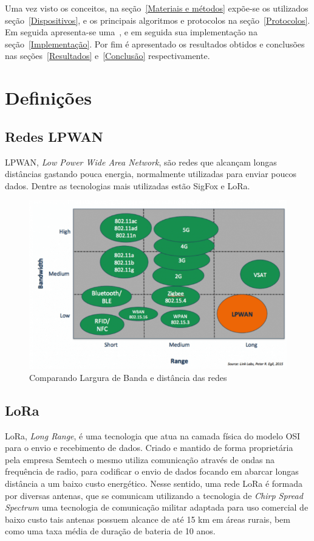 \documentclass[
article,			%
12pt,				%
oneside,			%
a4paper,			%
english,			%
brazil,				%
sumario=tradicional
]{abntex2}
\begin{document}
Uma vez visto os conceitos, na seção~\ref{Materiais e métodos} expõe-se os  utilizados seção~\ref{Dispositivos}, e os principais algoritmos e protocolos na seção~\ref{Protocolos}. Em seguida apresenta-se uma~, e em seguida sua implementação na seção~\ref{Implementação}. Por fim é apresentado os resultados obtidos e conclusões nas seções~\ref{Resultados} e~\ref{Conclusão} respectivamente.

\section{Definições}\label{Definições}
\subsection{Redes LPWAN}\label{Redes LPWAN}
LPWAN, \textit{Low Power Wide Area Network}, são redes que alcançam longas distâncias gastando pouca energia, normalmente utilizadas para enviar poucos dados\cite{introducao_lpwan_2017}. Dentre as tecnologias mais utilizadas estão SigFox e LoRa. 
\begin{figure}[!htb]
    \centering
    \includegraphics[width=.9\textwidth]{Comparativo-algumas-redes}
    \caption{\label{fig:Comparativo-algumas-redes}Comparando Largura de Banda e distância das redes\cite{introducao_lpwan_2017}}
\end{figure}

\subsection{LoRa}\label{LoRa}
LoRa, \textit{Long Range}, é uma tecnologia que atua na camada física do modelo OSI para o envio e recebimento de dados. Criado e mantido de forma proprietária pela empresa Semtech\cite{bor2016lora} o mesmo utiliza comunicação através de ondas na frequência de radio, para codificar o envio de dados focando em abarcar longas distância a um baixo custo energético. Nesse sentido, uma rede LoRa é formada por diversas antenas\cite{siteLorawan}, que se comunicam utilizando a tecnologia de \textit{Chirp Spread Spectrum}\cite{davcev2018iot} uma tecnologia de comunicação militar adaptada para uso comercial de baixo custo\cite{siteLorawan} tais antenas possuem alcance de até 15 km em áreas rurais\cite{adelantado2017understanding}, bem como uma taxa média de duração de bateria de 10 anos\cite{adelantado2017understanding}.
\end{document}
